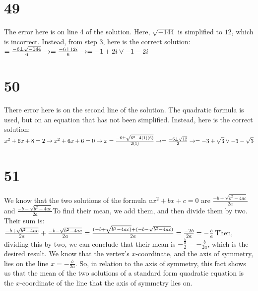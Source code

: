 \section*{49}
The error here is on line 4 of the solution. Here, $\sqrt{-144}$ is simplified to $12$, which is incorrect. Instead, from step 3, here is the correct
solution: $=\frac{-6\pm\sqrt{-144}}{6}\newline\rightarrow =\frac{-6\pm 12i}{6}\newline\rightarrow =-1+2i\vee -1-2i$

\section*{50}
There error here is on the second line of the solution. The quadratic formula is used, but on an equation that has not been simplified. Instead,
here is the correct solution: $x^2+6x+8=2\newline\rightarrow x^2+6x+6=0\newline\rightarrow x=\frac{-6\pm\sqrt{6^2-4(1)(6)}}{2(1)}\newline\rightarrow
=\frac{-6\pm\sqrt{12}}{2}\newline\rightarrow =-3+\sqrt{3}\vee -3-\sqrt{3}$

\section*{51}
We know that the two solutions of the formula $ax^2+bx+c=0$ are $\frac{-b+\sqrt{b^2-4ac}}{2a}$ and $\frac{-b-\sqrt{b^2-4ac}}{2a}$\newline To find their
mean, we add them, and then divide them by two. Their sum is:\newline $\frac{-b+\sqrt{b^2-4ac}}{2a}+\frac{-b-\sqrt{b^2-4ac}}{2a}\newline =
\frac{(-b+\sqrt{b^2-4ac)}+(-b-\sqrt{b^2-4ac})}{2a}=\frac{-2b}{2a}=-\frac{b}{a}$\newline Then, dividing this by two, we can conclude that their mean is
$-\frac{\frac{b}{a}}{2}=-\frac{b}{2a}$, which is the desired result. We know that the vertex's $x$-coordinate, and the axis of symmetry, lies on
the line $x=-\frac{b}{2a}$. So, in relation to the axis of symmetry, this fact shows us that the mean of the two solutions of a standard form
quadratic equation is the $x$-coordinate of the line that the axis of symmetry lies on.

